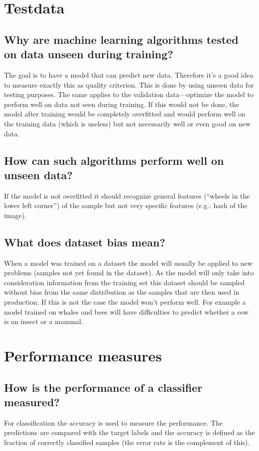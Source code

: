 \section{Testdata}
\subsection{Why are machine learning algorithms tested on data unseen during training?}
The goal is to have a model that can predict new data. Therefore it's a good idea to measure exactly this as quality criterion. This is done by using unseen data for testing purposes. The same applies to the validation data---optimize the model to perform well on data not seen during training. If this would not be done, the model after training would be completely overfitted and would perform well on the training data (which is useless) but not necessarily well or even good on new data.
\subsection{How can such algorithms perform well on unseen data?}
If the model is not overfitted it should recognize general features (``wheels in the lower left corner'') of the sample but not very specific features (e.g.: hash of the image). 
\subsection{What does dataset bias mean? }
When a model was trained on a dataset the model will usually be applied to new problems (samples not yet found in the dataset). As the model will only take into consideration information from the training set this dataset should be sampled without bias from the same distribution as the samples that are then used in production. If this is not the case the model won't perform well. For example a model trained on whales and bees will have difficulties to predict whether a cow is an insect or a mammal.
%
\section{Performance measures}
\subsection{How is the performance of a classifier measured?}
For classification the accuracy is used to measure the performance. The predictions are compared with the target labels and the accuracy is defined as the fraction of correctly classified samples (the error rate is the complement of this).
